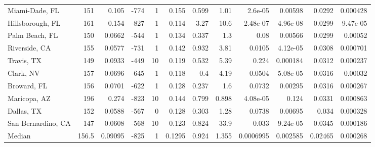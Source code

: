 \documentclass[12pt,letterpaper]{article}
\begin{document}
{\begin{appendices}
\begin{sidewaystable}
{\begin{tabular}{lrrrrrrrrrrr}
 Miami-Dade, FL     & 151   & 0.105   &  -774 &     1 &          0.155  &            0.599 &          1.01  &          2.6e-05   &           0.00598  &           0.0292  &        0.000428 \\
 Hillsborough, FL   & 161   & 0.154   &  -827 &     1 &          0.114  &            3.27  &         10.6   &          2.48e-07  &           4.96e-08 &           0.0299  &        9.47e-05 \\
 Palm Beach, FL     & 150   & 0.0662  &  -544 &     1 &          0.134  &            0.337 &          1.3   &          0.08      &           0.00566  &           0.0299  &        0.00052  \\
 Riverside, CA      & 155   & 0.0577  &  -731 &     1 &          0.142  &            0.932 &          3.81  &          0.0105    &           4.12e-05 &           0.0308  &        0.000701 \\
 Travis, TX         & 149   & 0.0933  &  -449 &    10 &          0.119  &            0.532 &          5.39  &          0.224     &           0.000184 &           0.0312  &        0.000237 \\
 Clark, NV          & 157   & 0.0696  &  -645 &     1 &          0.118  &            0.4   &          4.19  &          0.0504    &           5.08e-05 &           0.0316  &        0.00032  \\
 Broward, FL        & 156   & 0.0701  &  -622 &     1 &          0.128  &            0.237 &          1.6   &          0.0732    &           0.00295  &           0.0316  &        0.000267 \\
 Maricopa, AZ       & 196   & 0.274   &  -823 &    10 &          0.144  &            0.799 &          0.898 &          4.08e-05  &           0.124    &           0.0331  &        0.000863 \\
 Dallas, TX         & 152   & 0.0588  &  -567 &     0 &          0.128  &            0.303 &          1.28  &          0.0738    &           0.00695  &           0.034   &        0.000328 \\
 San Bernardino, CA & 147   & 0.0608  &  -568 &    10 &          0.123  &            0.824 &         33.9   &          0.033     &           9.24e-05 &           0.0345  &        0.000186 \\
\hline
 Median             & 156.5 & 0.09095 &  -825 &     1 &          0.1295 &            0.924 &          1.355 &          0.0006995 &           0.002585 &           0.02465 &        0.000268 \\
\hline
\end{tabular}
}\end{sidewaystable}



\end{appendices}}
\end{document}
